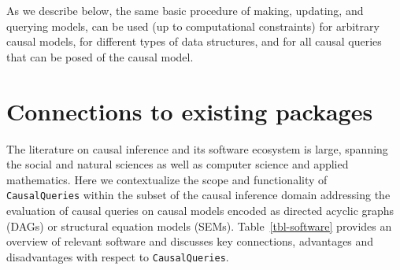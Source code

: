 \documentclass[
  11pt,
  article]{jss}
\begin{document}
As we describe below, the same basic procedure of making, updating, and
querying models, can be used (up to computational constraints) for
arbitrary causal models, for different types of data structures, and for
all causal queries that can be posed of the causal model.

\section{Connections to existing
packages}\label{connections-to-existing-packages}

The literature on causal inference and its software ecosystem is large,
spanning the social and natural sciences as well as computer science and
applied mathematics. Here we contextualize the scope and functionality
of \texttt{CausalQueries} within the subset of the causal inference
domain addressing the evaluation of causal queries on causal models
encoded as directed acyclic graphs (DAGs) or structural equation models
(SEMs). Table~\ref{tbl-software} provides an overview of relevant
software and discusses key connections, advantages and disadvantages
with respect to \texttt{CausalQueries}.
\end{document}
